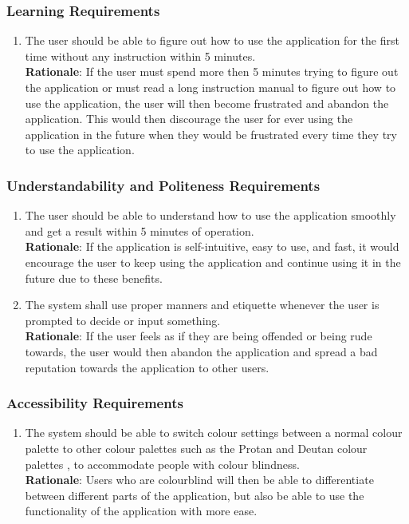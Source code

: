 \subsubsection{Learning Requirements}
\label{ssub:learning_requirements}
\begin{enumerate}[{UH-L}1. ]
	\item The user should be able to figure out how to use the application for the first time without any instruction within 5 minutes.
	\\ \textbf{Rationale}: If the user must spend more then 5 minutes trying to figure out the application or must read a long instruction manual to figure out how to use the application, the user will then become frustrated and abandon the application. This would then discourage the user for ever using the application in the future when they would be frustrated every time they try to use the application.	
\end{enumerate}

\subsubsection{Understandability and Politeness Requirements}
\label{ssub:understandability_and_politeness_requirements}
\begin{enumerate}[{UH-UP}1. ]
	\item The user should be able to understand how to use the application smoothly and get a result within 5 minutes of operation.\\ \textbf{Rationale}: If the application is self-intuitive, easy to use, and fast, it would encourage the user to keep using the application and continue using it in the future due to these benefits.
	\item The system shall use proper manners and etiquette whenever the user is prompted to decide or input something.\\ \textbf{Rationale}: If the user feels as if they are being offended or being rude towards, the user would then abandon the application and spread a bad reputation towards the application to other users.
\end{enumerate}


\subsubsection{Accessibility Requirements}
\label{ssub:accessibility_requirements}
\begin{enumerate}[{UH-A}1. ]
	\item The system should be able to switch colour settings between a normal colour palette to other colour palettes such as the Protan and Deutan colour palettes \cite{EnChroma2025}, to accommodate people with colour blindness.
	\\ \textbf{Rationale}: Users who are colourblind will then be able to differentiate between different parts of the application, but also be able to use the functionality of the application with more ease.
	
\end{enumerate}

